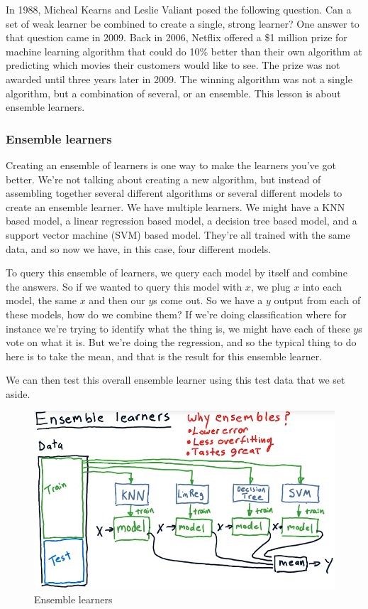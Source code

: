 \documentclass[12pt]{article}
\begin{document}
In 1988, Micheal Kearns and Leslie Valiant posed the following question. Can a set of weak learner be combined to create a single, strong learner? One answer to that question came in 2009. Back in 2006, Netflix offered a \$1 million prize for machine learning algorithm that could do 10\% better than their own algorithm at predicting which movies their customers would like to see. The prize was not awarded until three years later in 2009. The winning algorithm was not a single algorithm, but a combination of several, or an ensemble. This lesson is about ensemble learners. 

\subsubsection{Ensemble learners}

Creating an ensemble of learners is one way to make the learners you've got better. We're not talking about creating a new algorithm, but instead of assembling together several different algorithms or several different models to create an ensemble learner. We have multiple learners. We might have a KNN based model, a linear regression based model, a decision tree based model, and a support vector machine (SVM) based model. They're all trained with the same data, and so now we have, in this case, four different models. 

To query this ensemble of learners, we query each model by itself and combine the answers. So if we wanted to query this model with $x$, we plug $x$ into each model, the same $x$ and then our $y$s come out. So we have a $y$ output from each of these models, how do we combine them? If we're doing classification where for instance we're trying to identify what the thing is, we might have each of these $y$s vote on what it is. But we're doing the regression, and so the typical thing to do here is to take the mean, and that is the result for this ensemble learner. 

We can then test this overall ensemble learner using this test data that we set aside. 

\begin{figure}[!ht]
\centering
\includegraphics[scale=0.45]{fig/fig92}
\caption{Ensemble learners}
\end{figure}
\end{document}
